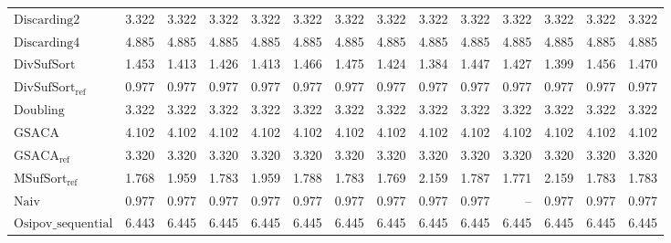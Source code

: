 \begin{table}[h]
{\begin{tabular}{lrrrrrrrrrrrrr}
    $\text{Discarding2}$ & 3.322 & 3.322 & 3.322 & 3.322 & 3.322 & 3.322 & 3.322 & 3.322 & 3.322 & 3.322 & 3.322 & 3.322 & 3.322 \\
    $\text{Discarding4}$ & {\color{red}4.885} & {\color{red}4.885} & {\color{red}4.885} & {\color{red}4.885} & {\color{red}4.885} & {\color{red}4.885} & {\color{red}4.885} & {\color{red}4.885} & {\color{red}4.885} & {\color{red}4.885} & {\color{red}4.885} & {\color{red}4.885} & {\color{red}4.885} \\
    $\text{DivSufSort}$ & 1.453 & 1.413 & 1.426 & 1.413 & 1.466 & 1.475 & 1.424 & 1.384 & 1.447 & 1.427 & 1.399 & 1.456 & 1.470 \\
    $\text{DivSufSort}_{\text{ref}}$ & {\color{green!60!black}0.977} & 0.977 & 0.977 & 0.977 & {\color{green!60!black}0.977} & {\color{green!60!black}0.977} & {\color{green!60!black}0.977} & {\color{green!60!black}0.977} & {\color{green!60!black}0.977} & {\color{green!60!black}0.977} & {\color{green!60!black}0.977} & {\color{green!60!black}0.977} & {\color{green!60!black}0.977} \\
    $\text{Doubling}$ & 3.322 & 3.322 & 3.322 & 3.322 & 3.322 & 3.322 & 3.322 & 3.322 & 3.322 & 3.322 & 3.322 & 3.322 & 3.322 \\
    $\text{GSACA}$ & 4.102 & 4.102 & 4.102 & 4.102 & 4.102 & 4.102 & 4.102 & 4.102 & 4.102 & 4.102 & 4.102 & 4.102 & 4.102 \\
    $\text{GSACA}_{\text{ref}}$ & 3.320 & 3.320 & 3.320 & 3.320 & 3.320 & 3.320 & 3.320 & 3.320 & 3.320 & 3.320 & 3.320 & 3.320 & 3.320 \\
    $\text{MSufSort}_{\text{ref}}$ & 1.768 & 1.959 & 1.783 & 1.959 & 1.788 & 1.783 & 1.769 & 2.159 & 1.787 & 1.771 & 2.159 & 1.783 & 1.783 \\
    $\text{Naiv}$ & {\color{green!60!black}0.977} & {\color{green!60!black}0.977} & {\color{green!60!black}0.977} & {\color{green!60!black}0.977} & {\color{green!60!black}0.977} & {\color{green!60!black}0.977} & {\color{green!60!black}0.977} & {\color{green!60!black}0.977} & {\color{green!60!black}0.977} & {\color{darkgray}--} & {\color{green!60!black}0.977} & {\color{green!60!black}0.977} & {\color{green!60!black}0.977} \\
    $\text{Osipov\_sequential}$ & {\color{red}6.443} & {\color{red}6.445} & {\color{red}6.445} & {\color{red}6.445} & {\color{red}6.445} & {\color{red}6.445} & {\color{red}6.445} & {\color{red}6.445} & {\color{red}6.445} & {\color{red}6.445} & {\color{red}6.445} & {\color{red}6.445} & {\color{red}6.445} \\

\end{tabular}}
\end{table}
